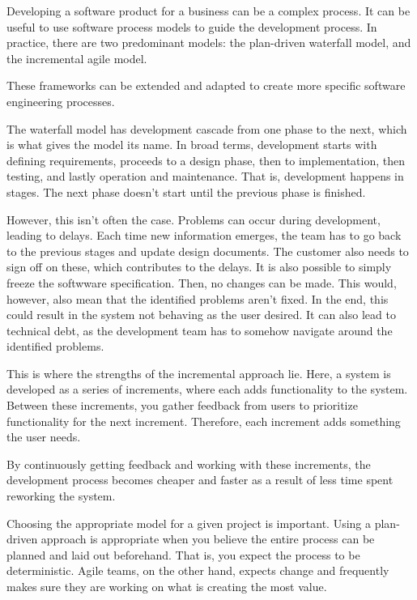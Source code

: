 
Developing a software product for a business can be a complex process.
It can be useful to use software process models to guide the development process.
In practice, there are two predominant models: the plan-driven waterfall model, and the incremental agile model.

These frameworks can be extended and adapted to create more specific software engineering processes.

The waterfall model has development cascade from one phase to the next, which is what gives the model its name.
In broad terms, development starts with defining requirements, proceeds to a design phase, then to implementation, then testing, and lastly operation and maintenance.
That is, development happens in stages. The next phase doesn't start until the previous phase is finished.

However, this isn't often the case. Problems can occur during development, leading to delays. Each time new information emerges, the team has to go back to the previous stages and update design documents. The customer also needs to sign off on these, which contributes to the delays.
It is also possible to simply freeze the softwware specification. Then, no changes can be made. This would, however, also mean that the identified problems aren't fixed. In the end, this could result in the system not behaving as the user desired. It can also lead to technical debt, as the development team has to somehow navigate around the identified problems.

This is where the strengths of the incremental approach lie. Here, a system is developed as a series of increments, where each adds functionality to the system. Between these increments, you gather feedback from users to prioritize functionality for the next increment. Therefore, each increment adds something the user needs.

By continuously getting feedback and working with these increments, the development process becomes cheaper and faster as a result of less time spent reworking the system.\cite{sommervilleSoftwareEngineering2016}

Choosing the appropriate model for a given project is important.
Using a plan-driven approach is appropriate when you believe the entire process can be planned and laid out beforehand. That is, you expect the process to be deterministic.
Agile teams, on the other hand, expects change and frequently makes sure they are working on what is creating the most value.

